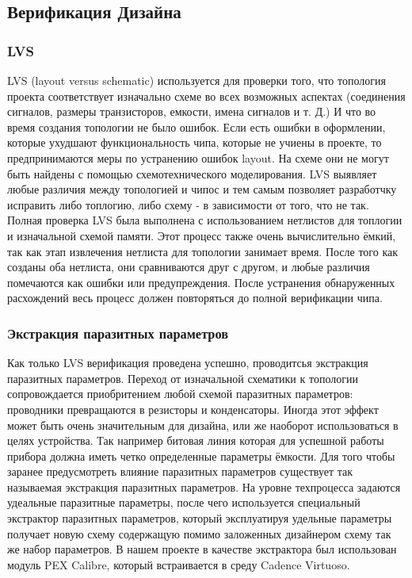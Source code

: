 \documentclass[a4paper,12pt]{article} %
\begin{document}
\subsection{Верификация Дизайна}
\label{subsec:veryf}


\subsubsection{LVS}

LVS (layout versus schematic) используется для проверки того, что топология проекта соответствует изначально  схеме во всех возможных аспектах (соединения сигналов, размеры транзисторов, емкости, имена сигналов и т. Д.) И что во время создания топологии не было ошибок. Если есть
ошибки в оформлении, которые ухудшают функциональность чипа, которые не учиены в проекте, то предпринимаются меры по устранению ошибок layout.
На схеме они не могут быть найдены с помощью схемотехнического моделирования. LVS выявляет любые различия между топологией и чипос и тем самым позволяет разработчку
исправить либо топлогию, либо схему - в зависимости от того, что не так.
Полная проверка LVS была выполнена с использованием  нетлистов для топлогии и
изначальной схемой памяти. Этот процесс также очень вычислительно ёмкий, так как этап извлечения нетлиста для топологии занимает время. После того как созданы оба нетлиста, они
сравниваются друг с другом, и любые различия помечаются как ошибки или предупреждения. После устранения обнаруженных расхождений весь процесс должен повторяться до полной верификации чипа.


\subsubsection{Экстракция паразитных параметров}
\label{subsec:parasitic}
Как только LVS верификация  проведена успешно, проводитсья экстракция паразитных параметров. Переход от изначальной  схематики  к топологии сопровождается приобритением любой схемой паразитных параметров: проводники превращаются в резисторы и конденсаторы. Иногда этот эффект может быть очень значительным для дизайна, или же наоборот использоваться в целях устройства. Так например битовая линия которая для успешной работы прибора должна иметь четко определенные параметры ёмкости. Для того чтобы заранее предусмотреть влияние паразитных параметров существует так называемая экстракция паразитных параметров. На уровне техпроцесса задаются удеальные паразитные параметры, после чего используется специальный экстрактор паразитных параметров, который эксплуатируя  удельные параметры получает новую схему содержащую помимо заложенных дизайнером схему так же набор параметров.  В нашем проекте в качестве экстрактора был использован модуль PEX Calibre, который встраивается в среду Cadence Virtuoso.
\end{document}
